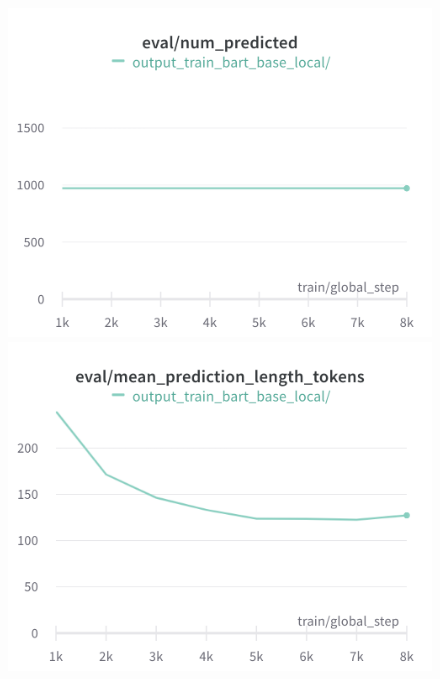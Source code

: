 \begin{figure}[!htb]
\includegraphics[width=\linewidth]{wandb/charts/Section-4-Panel-2-7v9p2n6qw}
\caption{}
\endminipage\hfill
{}
\includegraphics[width=\linewidth]{wandb/charts/Section-4-Panel-3-d4b23g8ks}
\caption{}
\endminipage
\end{figure}

